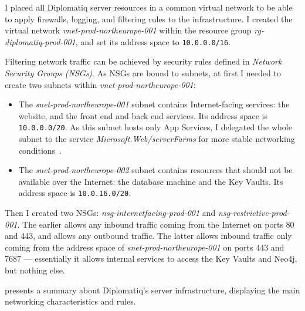 I placed all Diplomatiq server resources in a common virtual network to be able to apply firewalls, logging, and filtering rules to the infrastructure. I created the virtual network \emph{vnet-prod-northeurope-001} within the resource group \emph{rg-diplomatiq-prod-001}, and set its address space to \lstinline{10.0.0.0/16}.

Filtering network traffic can be achieved by security rules defined in \emph{Network Security Groups (NSGs)}. As NSGs are bound to subnets, at first I needed to create two subnets within \emph{vnet-prod-northeurope-001}:

\begin{itemize}
\item The \emph{snet-prod-northeurope-001} subnet contains Internet-facing services: the website, and the front end and back end services. Its address space is \lstinline{10.0.0.0/20}. As this subnet hosts only App Services, I delegated the whole subnet to the service \emph{Microsoft.Web/serverFarms} for more stable networking conditions~\cite{subnetdelegation}.
\item The \emph{snet-prod-northeurope-002} subnet contains resources that should not be available over the Internet: the database machine and the Key Vaults. Its address space is \lstinline{10.0.16.0/20}.
\end{itemize}

Then I created two NSGs: \emph{nsg-internetfacing-prod-001} and \emph{nsg-restrictive-prod-001}. The earlier allows any inbound traffic coming from the Internet on ports 80 and 443, and allows any outbound traffic. The latter allows inbound traffic only coming from the address space of \emph{snet-prod-northeurope-001} on ports 443 and 7687 — essentially it allows internal services to access the Key Vaults and Neo4j, but nothing else.

 presents a summary about Diplomatiq's server infrastructure, displaying the main networking characteristics and rules.

